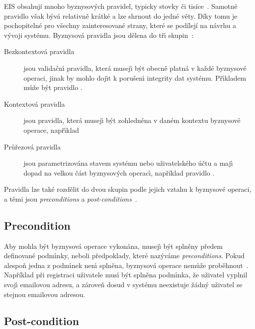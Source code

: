 \gls{EIS} obsahují mnoho byznysových pravidel, typicky stovky či tisíce~\cite{morgan2002business}.
Samotné pravidlo však bývá relativně krátké a lze shrnout do jedné věty. Díky tomu je pochopitelné
pro všechny zainteresované strany, které se podílejí na návrhu a vývoji systému.
Byznysová pravidla jsou dělena do tř\'{\i} skupin~\cite{cemus2014aspect}:

\begin{description}
    \item [Bezkontextová pravidla] jsou validačn\'{\i} pravidla, která musej\'{\i} b\'yt obecně platná
    v každé byznysové operaci, jinak by mohlo doj\'{\i}t k porušen\'{\i} integrity dat systému.
    Př\'{\i}kladem může b\'yt pravidlo .
    \item [Kontextová pravidla] jsou pravidla, která musej\'{\i} b\'yt zohledněna v daném kontextu
    byznysové operace, např\'{\i}klad 
    \item [Průřezová pravidla] jsou parametrizována stavem systému nebo uživatelského účtu a maj\'{\i}
    dopad na velkou část byznysov\'ych operac\'{\i}, například pravidlo .
\end{description}

Pravidla lze také rozdělit do dvou skupin podle jejich vztahu k byznysové operaci, a těmi jsou
\textit{preconditions} a \textit{post-conditions}~\cite{morgan2002business, cemus2015automated}.

\subsection{Precondition}

Aby mohla b\'yt byznysová operace vykonána, musej\'{\i}
b\'yt splněny předem definované podm\'{\i}nky, neboli předpoklady,
které naz\'yváme \textit{preconditions}. Pokud alespoň jedna z podm\'{\i}nek
nen\'{\i} splněna, byznysová operace nemůže proběhnout~\cite{larman2001patterns}.
Například při registraci uživatele mus\'{\i} b\'yt splněna podm\'{\i}nka,
že uživatel vyplnil svoj\'{\i} emailovou adresu, a zároveň
dosud v systému neexistuje žádn\'y uživatel se stejnou emailovou adresou.

\subsection{Post-condition}

